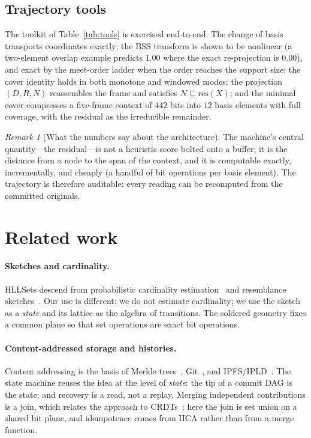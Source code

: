 \documentclass[11pt,a4paper]{article}
\theoremstyle{remark}
\newtheorem{remark}[principle]{Remark}
\newcommand{\res}{\ensuremath{\mathrm{res}}}          %
\begin{document}
\subsection{Trajectory tools}

The toolkit of Table~\ref{tab:tools} is exercised end-to-end. The change of
basis transports coordinates exactly; the BSS transform is shown to be
nonlinear (a two-element overlap example predicts $1.00$ where the exact
re-projection is $0.00$), and exact by the meet-order ladder when the order
reaches the support size; the cover identity holds in both monotone and windowed
modes; the projection $(D,R,N)$ reassembles the frame and satisfies
$N\subseteq\res(X)$; and the minimal cover compresses a five-frame context of
$442$ bits into $12$ basis elements with full coverage, with the residual as the
irreducible remainder.

\begin{remark}[What the numbers say about the architecture]
The machine's central quantity---the residual---is not a heuristic score bolted
onto a buffer; it is the distance from a node to the span of the context, and it
is computable exactly, incrementally, and cheaply (a handful of bit operations
per basis element). The trajectory is therefore auditable: every reading can be
recomputed from the committed originals.
\end{remark}

\section{Related work}
\label{sec:related}

\paragraph{Sketches and cardinality.} HLLSets descend from probabilistic
cardinality estimation~\cite{flajolet2007,bloom1970} and resemblance
sketches~\cite{broder1997}. Our use is different: we do not estimate
cardinality; we use the sketch as a \emph{state} and its lattice as the algebra
of transitions. The soldered geometry fixes a common plane so that set
operations are exact bit operations.

\paragraph{Content-addressed storage and histories.} Content addressing is the
basis of Merkle trees~\cite{merkle1988}, Git~\cite{git}, and
IPFS/IPLD~\cite{benet2014}. The state machine reuses the idea at the level of
\emph{state}: the tip of a commit DAG is the state, and recovery is a read, not
a replay. Merging independent contributions is a join, which relates the
approach to CRDTs~\cite{shapiro2011}; here the join is set union on a shared
bit plane, and idempotence comes from IICA rather than from a merge function.
\end{document}
